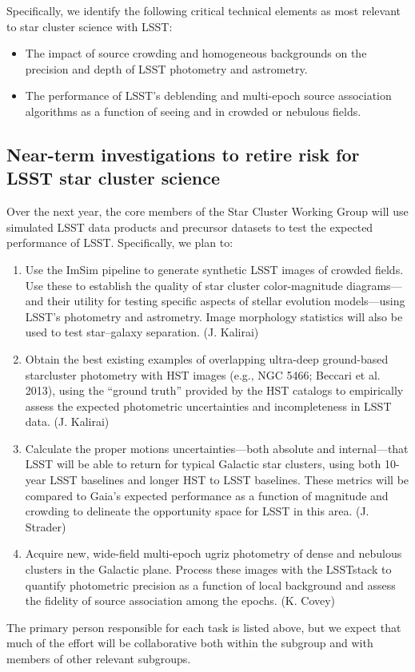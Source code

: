 Specifically, we identify the following critical technical elements as most relevant to star cluster science with LSST: 
\begin{itemize}
\item The impact of source crowding and homogeneous backgrounds on the precision and depth of LSST photometry and astrometry. 
\item The performance of LSST’s deblending and multi-epoch source association algorithms as a function of seeing and in crowded or nebulous fields. 
\end{itemize}

\subsection{Near-term investigations to retire risk for LSST star cluster science }

Over the next year, the core members of the Star Cluster Working Group will use simulated LSST data products and precursor datasets to test the expected performance of LSST. Specifically, we plan to: 
\begin{enumerate}
\item{Use the ImSim pipeline to generate synthetic LSST images of crowded fields. Use these to establish the quality of star cluster color-magnitude diagrams—and their utility for testing specific aspects of stellar evolution models—using LSST’s photometry and astrometry. Image morphology statistics will also be used to test star–galaxy separation. (J. Kalirai) }
\item{Obtain the best existing examples of overlapping 
ultra-deep ground-based starcluster photometry with HST images 
(e.g., NGC 5466; Beccari et al. 2013), using the “ground truth” provided by the HST catalogs to empirically assess the expected photometric uncertainties and incompleteness in LSST data. (J. Kalirai) }
\item{Calculate the proper motions uncertainties—both absolute and internal—that LSST will be able to return for typical Galactic star clusters, using both 10-year LSST baselines and longer HST to LSST baselines. These metrics will be compared to Gaia’s expected performance as a function of magnitude and crowding to delineate the opportunity space for LSST in this area. (J. Strader) }
\item{Acquire new, wide-field multi-epoch ugriz photometry of dense and nebulous clusters in the Galactic plane. Process these images with the LSSTstack to quantify photometric precision as a function of local background and assess the fidelity of source association among the epochs. (K. Covey) }
\end{enumerate}

The primary person responsible for each task is listed above, but we expect that much of the effort will be collaborative both within the subgroup and with members of other relevant subgroups. 



